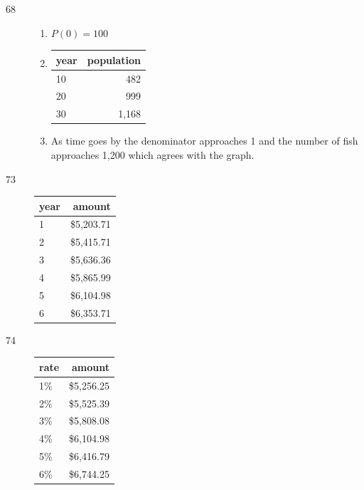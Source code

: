 \documentclass{exam}
\begin{document}
\begin{description}
\begin{enumerate}[a]
        \end{enumerate}

      \item[68]
        \begin{enumerate}[a]
          \item $P(0) = 100$

          \item
            \begin{tabular}[H]{lr}
              \toprule
              year & population \\
              \midrule
              10   & 482 \\
              20   & 999 \\
              30   & 1,168 \\
              \bottomrule
            \end{tabular}

          \item As time goes by the denominator approaches 1 and the number of fish approaches 1,200 which agrees with
            the graph.

        \end{enumerate}

      \item[73]
        \begin{tabular}[H]{lr}
          \toprule
          year & amount \\
          \midrule
          1    & \$5,203.71 \\
          2    & \$5,415.71 \\
          3    & \$5,636.36 \\
          4    & \$5,865.99 \\
          5    & \$6,104.98 \\
          6    & \$6,353.71 \\
          \bottomrule
        \end{tabular}

      \item[74]
        \begin{tabular}[H]{lr}
          \toprule
          rate & amount \\
          \midrule
          1\% & \$5,256.25 \\
          2\% & \$5,525.39 \\
          3\% & \$5,808.08 \\
          4\% & \$6,104.98 \\
          5\% & \$6,416.79 \\
          6\% & \$6,744.25 \\
          \bottomrule
        \end{tabular}


\end{description}
\end{document}
